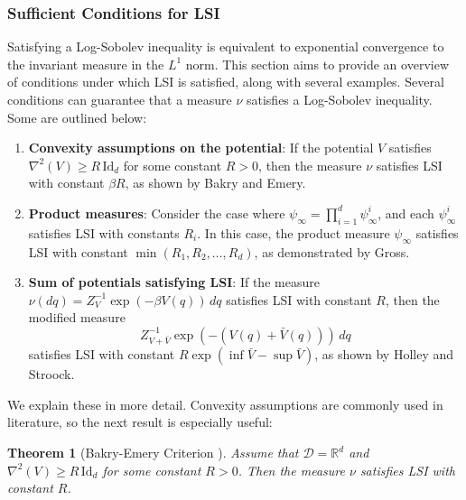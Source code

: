 \documentclass[11pt, twoside]{report}
\newtheorem{theorem}{Theorem}[section]
\begin{document}
\subsubsection{Sufficient Conditions for LSI}

Satisfying a Log-Sobolev inequality is equivalent to exponential convergence to the invariant measure in the $ L^1 $ norm. This section aims to provide an overview of conditions under which LSI is satisfied, along with several examples. Several conditions can guarantee that a measure $\nu$ satisfies a Log-Sobolev inequality. Some are outlined below:

\begin{enumerate}
    \item \textbf{Convexity assumptions on the potential}: 
    If the potential $ V $ satisfies $ \nabla^2(V) \geq R \, \mathrm{Id}_d $ for some constant $ R > 0 $, then the measure $ \nu $ satisfies LSI with constant $ \beta R $, as shown by Bakry and Emery\cite{bakryemery}.
    
    \item \textbf{Product measures}: 
    Consider the case where $ \psi_\infty = \prod_{i=1}^d \psi_\infty^i $, and each $ \psi_\infty^i $ satisfies LSI with constants $ R_i $. In this case, the product measure $ \psi_\infty $ satisfies LSI with constant $ \min(R_1, R_2, \dots, R_d) $, as demonstrated by Gross\cite{Gross1975}.
    
    \item \textbf{Sum of potentials satisfying LSI}: 
    If the measure $ \nu(dq) = Z_V^{-1} \exp{(-\beta V(q))} \, dq $ satisfies LSI with constant $ R $, then the modified measure
    \[
    Z_{V + \bar{V}}^{-1} \exp{(-(V(q) + \bar{V}(q)))} \, dq
    \]
    satisfies LSI with constant $ R \exp(\inf \bar{V} - \sup \bar{V}) $, as shown by Holley and Stroock\cite{Holley1987}.
\end{enumerate}
We explain these in more detail. Convexity assumptions are commonly used in literature, so the next result is especially useful: 
\begin{theorem}[Bakry-Emery Criterion \cite{bakryemery}]
    Assume that $\mathcal{D} = \mathbb{R}^d$ and $\nabla^2(V) \geq R \, \mathrm{Id}_d$ for some constant $R > 0$. Then the measure $\nu$ satisfies LSI with constant  $R$.
\end{theorem}
\end{document}
